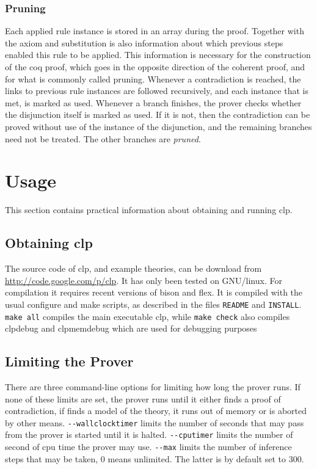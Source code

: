 \documentclass[a4paper]{article}
\begin{document}
\subsubsection{Pruning}
Each applied rule instance is stored in an array during the proof. Together with the axiom and substitution is also information about which previous steps enabled this rule to be applied. This information is necessary for the construction of the coq proof, which goes in the opposite direction of the coherent proof, and for what is commonly called pruning. Whenever a contradiction is reached, the links to previous rule instances are followed recursively, and each instance that is met, is marked as used. Whenever a branch finishes, the prover checks whether the disjunction itself is marked as used. If it is not, then the contradiction can be proved without use of the instance of the disjunction, and the remaining branches need not be treated. The other branches are \emph{pruned}.
\section{Usage}
This section contains practical information about obtaining and running clp.
\subsection{Obtaining clp}
The source code of clp, and example theories, can be download from \url{http://code.google.com/p/clp}. It has only been tested on GNU/linux. For compilation it requires recent versions of bison and flex. It is compiled with the usual configure and make scripts, as described in the files \verb|README| and \verb|INSTALL|. \verb|make all| compiles the main executable clp, while \verb|make check| also compiles clpdebug and clpmemdebug which are used for debugging purposes


\subsection{Limiting the Prover}
There are three command-line options for limiting how long the prover runs. If none of these limits are set, the prover runs until it either finds a proof of contradiction, if finds a model of the theory, it runs out of memory or is aborted by other means. \verb|--wallclocktimer| limits the number of seconds that may pass from the prover is started until it is halted. \verb|--cputimer| limits the number of second of cpu time the prover may use. \verb|--max| limits the number of inference steps that may be taken, $0$ means unlimited. The latter is by default set to $300$.
\end{document}
